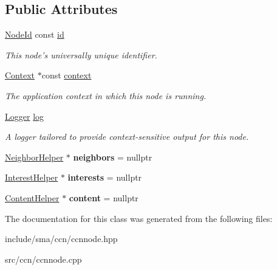 \subsection*{Public Attributes}
\begin{DoxyCompactItemize}
\item 
\hypertarget{classsma_1_1CcnNode_a5a7ffc5e2e82045309209b1f12738a28}{\hyperlink{structsma_1_1NodeId}{Node\-Id} const \hyperlink{classsma_1_1CcnNode_a5a7ffc5e2e82045309209b1f12738a28}{id}}\label{classsma_1_1CcnNode_a5a7ffc5e2e82045309209b1f12738a28}

\begin{DoxyCompactList}\small\item\em This node's universally unique identifier. \end{DoxyCompactList}\item 
\hypertarget{classsma_1_1CcnNode_abbaf22b4425aed73167cd4388bf75c79}{\hyperlink{structsma_1_1Context}{Context} $\ast$const \hyperlink{classsma_1_1CcnNode_abbaf22b4425aed73167cd4388bf75c79}{context}}\label{classsma_1_1CcnNode_abbaf22b4425aed73167cd4388bf75c79}

\begin{DoxyCompactList}\small\item\em The application context in which this node is running. \end{DoxyCompactList}\item 
\hypertarget{classsma_1_1CcnNode_a5867477dffdb0dddcc511214af331ccc}{\hyperlink{structsma_1_1Logger}{Logger} \hyperlink{classsma_1_1CcnNode_a5867477dffdb0dddcc511214af331ccc}{log}}\label{classsma_1_1CcnNode_a5867477dffdb0dddcc511214af331ccc}

\begin{DoxyCompactList}\small\item\em A logger tailored to provide context-\/sensitive output for this node. \end{DoxyCompactList}\item 
\hypertarget{classsma_1_1CcnNode_aa0e5f4ad986b897c5edfdd4e42623974}{\hyperlink{classsma_1_1NeighborHelper}{Neighbor\-Helper} $\ast$ {\bfseries neighbors} = nullptr}\label{classsma_1_1CcnNode_aa0e5f4ad986b897c5edfdd4e42623974}

\item 
\hypertarget{classsma_1_1CcnNode_ac1af2b3ea71ceac332ddcdb87ba0a6d2}{\hyperlink{classsma_1_1InterestHelper}{Interest\-Helper} $\ast$ {\bfseries interests} = nullptr}\label{classsma_1_1CcnNode_ac1af2b3ea71ceac332ddcdb87ba0a6d2}

\item 
\hypertarget{classsma_1_1CcnNode_a6b74f9416d455197d2a755a4ff2f5b56}{\hyperlink{classsma_1_1ContentHelper}{Content\-Helper} $\ast$ {\bfseries content} = nullptr}\label{classsma_1_1CcnNode_a6b74f9416d455197d2a755a4ff2f5b56}

\end{DoxyCompactItemize}


The documentation for this class was generated from the following files\-:\begin{DoxyCompactItemize}
\item 
include/sma/ccn/ccnnode.\-hpp\item 
src/ccn/ccnnode.\-cpp\end{DoxyCompactItemize}
